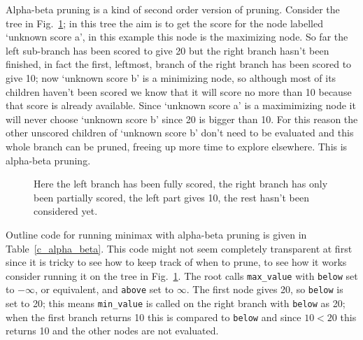 \documentclass[11pt,a4paper]{scrartcl}
\begin{document}
Alpha-beta pruning is a kind of second order version of
pruning. Consider the tree in Fig.~\ref{fig:partial}; in this tree the
aim is to get the score for the node labelled \lq{}unknown score
a\rq{}, in this example this node is the maximizing node. So far the
left sub-branch has been scored to give 20 but the right branch hasn't
been finished, in fact the first, leftmost, branch of the right branch
has been scored to give 10; now \lq{}unknown score b\rq{} is a
minimizing node, so although most of its children haven't been scored
we know that it will score no more than 10 because that score is
already available. Since \lq{}unknown score a\rq{} is a maximimizing
node it will never choose \lq{}unknown score b\rq{} since 20 is bigger
than 10. For this reason the other unscored children of \lq{}unknown
score b\rq{} don't need to be evaluated and this whole branch can be
pruned, freeing up more time to explore elsewhere. This is alpha-beta
pruning.

\begin{figure}
\begin{center}
\end{center}
\caption{Here the left branch has been fully scored, the right branch has only been partially scored, the left part gives 10, the rest hasn't been considered yet.\label{fig:partial}}
\end{figure}

Outline code for running minimax with alpha-beta pruning is given in
Table~\ref{c_alpha_beta}. This code might not seem completely
transparent at first since it is tricky to see how to keep track of
when to prune, to see how it works consider running it on the tree in
Fig.~\ref{fig:partial}. The root calls \texttt{max\_value} with
\texttt{below} set to $-\infty$, or equivalent, and \texttt{above} set
to $\infty$. The first node gives 20, so \texttt{below} is set to 20;
this means \texttt{min\_value} is called on the right branch with
\texttt{below} as 20; when the first branch returns 10 this is
compared to \texttt{below} and since $10<20$ this returns 10 and the
other nodes are not evaluated.
\end{document}
